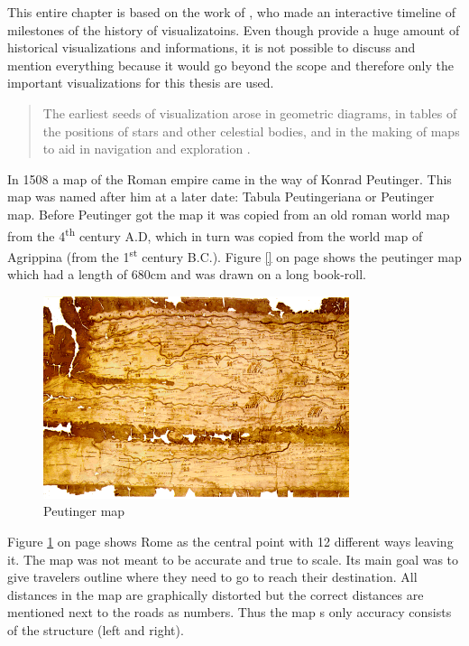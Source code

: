 This entire chapter is based on the work of \citeauthor{Friendly.2001}, who made an interactive timeline of milestones of the history of visualizatoins. Even though \citeauthor{Friendly.2001} provide a huge amount of historical visualizations and informations, it is not possible to discuss and mention everything because it would go beyond the scope and therefore only the important visualizations for this thesis are used.

\begin{quote}
    The earliest seeds of visualization arose in geometric diagrams, in tables of the positions of stars and other celestial bodies, and in the making of maps to aid in navigation and exploration .
\end{quote}

In 1508 a map of the Roman empire came in the way of Konrad Peutinger. This map was named after him at a later date: Tabula Peutingeriana or Peutinger map. Before Peutinger got the map it was copied from an old roman world map from the 4\textsuperscript{th} century A.D, which in turn was copied from the world map of Agrippina (from the 1\textsuperscript{st} century B.C.). Figure \ref{} on page \pageref{} shows the peutinger map which had a length of 680cm and was drawn on a long book-roll.

\begin{figure}[h]
\centering
\includegraphics[width=0.8\textwidth,keepaspectratio]{images/history/peutinger.png}
\caption[
    Peutinger map, Urldate: 07.2016 \newline
\small\texttt{\url{https://web.archive.org/web/20080129123649/http://www.kargi.de/Geschichte/Peutinger/Peutinger.bmp}}
]{Peutinger map}
\label{fig:peutinger-rome}
\end{figure}

Figure \ref{fig:peutinger-rome} on page \pageref{fig:peutinger-rome} shows Rome as the central point with 12 different ways leaving it. The map was not meant to be accurate and true to scale. Its main goal was to give travelers outline where they need to go to reach their destination. All distances in the map are graphically distorted but the correct distances are mentioned next to the roads as numbers. Thus the map
s only accuracy consists of the structure (left and right).

